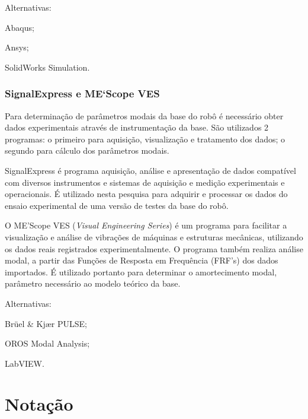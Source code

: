 Alternativas:
%
\begin{enumerate*}
	\item Abaqus;
	\item Ansys;
	\item SolidWorks Simulation.
\end{enumerate*}


\subsubsection{SignalExpress e ME`Scope VES}

Para determinação de parâmetros modais da base do robô é necessário obter dados
experimentais através de instrumentação da base. São utilizados 2 programas: o
primeiro para aquisição, visualização e tratamento dos dados; o segundo para
cálculo dos parâmetros modais.

SignalExpress\cite{signalexpress} é programa aquisição, análise e
apresentação de dados compatível com diversos instrumentos e sistemas de
aquisição e medição experimentais e operacionais. 
É utilizado nesta pesquisa para adquirir e processar os dados do ensaio
experimental de uma versão de testes da base do robô.

O ME'Scope VES (\textit{Visual Engineering Series})\cite{mescope} é um programa
para facilitar a visualização e análise de vibrações de máquinas e estruturas
mecânicas, utilizando os dados reais registrados experimentalmente. O programa
também realiza análise modal, a partir das Funções de Resposta em Frequência
(FRF's) dos dados importados. É utilizado portanto para  determinar o
amortecimento modal, parâmetro necessário ao modelo teórico da base.

Alternativas:
%
\begin{enumerate*}
	\item Brüel \& Kjær PULSE;
	\item OROS Modal Analysis;
	\item LabVIEW.
\end{enumerate*}

\section{Notação}


